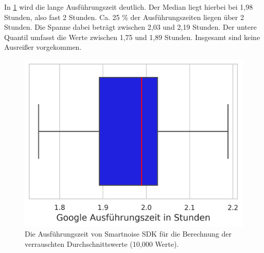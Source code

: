 In \cref{fig:boxplot_sn} wird die lange Ausführungszeit deutlich. Der Median liegt hierbei bei 1,98 Stunden, also fast 2 Stunden. Ca. 25 \% der Ausführungszeiten liegen über 2 Stunden. Die Spanne dabei beträgt zwischen 2,03 und 2,19 Stunden. Der untere Quantil umfasst die Werte zwischen 1,75 und 1,89 Stunden. Insgesamt sind keine Ausreißer vorgekommen.
\begin{figure}[p]
	\centering
	\includegraphics[scale=0.6]{./images/boxplot_sn.png}
	\caption{Die Ausführungszeit von Smartnoise SDK für die Berechnung der verrauschten Durchschnittswerte (10,000 Werte).}
	\label{fig:boxplot_sn}
	\vspace{100in}
\end{figure}